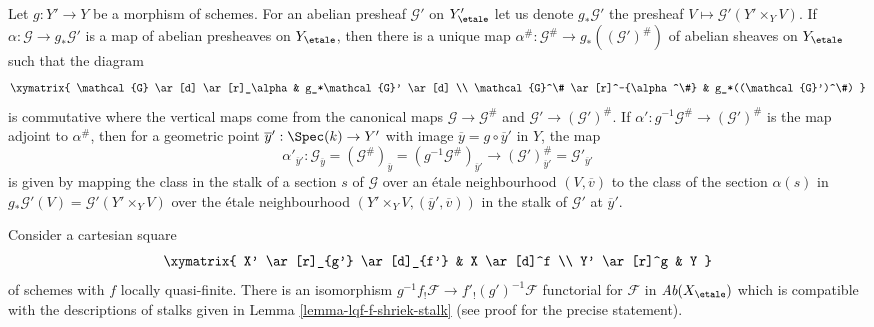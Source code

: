 \begin{remark}
\label{remark-construct-map-presheaves-downstairs}
Let $g : Y' \to Y$ be a morphism of schemes.
For an abelian presheaf $\mathcal{G}'$ on $Y'_\etale$ let us denote
$g_*\mathcal{G}'$ the presheaf $V \mapsto \mathcal{G}'(Y' \times_Y V)$.
If $\alpha : \mathcal{G} \to g_*\mathcal{G}'$ is a map of abelian presheaves
on $Y_\etale$, then there is a unique map
$\alpha^\# : \mathcal{G}^\# \to g_*((\mathcal{G}')^\#)$
of abelian sheaves on $Y_\etale$ such that the diagram
$$
\xymatrix{
\mathcal{G} \ar[d] \ar[r]_\alpha & g_*\mathcal{G}' \ar[d] \\
\mathcal{G}^\# \ar[r]^-{\alpha^\#} & g_*((\mathcal{G}')^\#)
}
$$
is commutative where the vertical maps come from the canonical maps
$\mathcal{G} \to \mathcal{G}^\#$ and $\mathcal{G}' \to (\mathcal{G}')^\#$. If
$\alpha' : g^{-1}\mathcal{G}^\# \to (\mathcal{G}')^\#$
is the map adjoint to $\alpha^\#$, then for a geometric point
$\overline{y}' : \Spec(k) \to Y'$ with image
$\overline{y} = g \circ \overline{y}'$ in $Y$, the map
$$
\alpha'_{\overline{y}'} :
\mathcal{G}_{\overline{y}} =
(\mathcal{G}^\#)_{\overline{y}} =
(g^{-1}\mathcal{G}^\#)_{\overline{y}'}
\longrightarrow
(\mathcal{G}')^\#_{\overline{y}'} =
\mathcal{G}'_{\overline{y}'}
$$
is given by mapping the class in the stalk of a section $s$ of $\mathcal{G}$
over an \'etale neighbourhood $(V, \overline{v})$ to the class of the section
$\alpha(s)$ in $g_*\mathcal{G}'(V) = \mathcal{G}'(Y' \times_Y V)$
over the \'etale neighbourhood $(Y' \times_Y V, (\overline{y}', \overline{v}))$
in the stalk of $\mathcal{G}'$ at $\overline{y}'$.
\end{remark}

\begin{lemma}
\label{lemma-lqf-base-change-f-shriek}
Consider a cartesian square
$$
\xymatrix{
X' \ar[r]_{g'} \ar[d]_{f'} & X \ar[d]^f \\
Y' \ar[r]^g & Y
}
$$
of schemes with $f$ locally quasi-finite. There is an isomorphism
$g^{-1}f_!\mathcal{F} \to f'_!(g')^{-1}\mathcal{F}$ functorial for
$\mathcal{F}$ in $\textit{Ab}(X_\etale)$ which is compatible with
the descriptions of stalks given in Lemma \ref{lemma-lqf-f-shriek-stalk}
(see proof for the precise statement).
\end{lemma}

